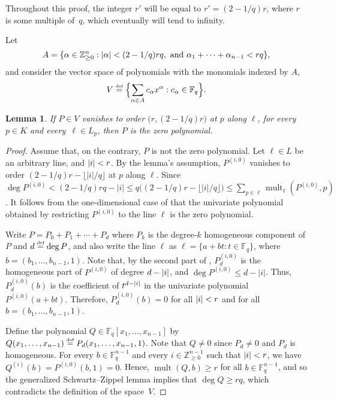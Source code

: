 \documentclass{daj}
\newtheorem{lemma}[theorem]{Lemma}
\theoremstyle{definition}
\newcommand*{\eqdef}{\stackrel{\mbox{\normalfont\tiny def}}{=}}   %
\newcommand*{\Znneg}{\mathbb{Z}_{\geq 0}}                          %
\newcommand*{\Fq}{\mathbb{F}_q}                                  %
\DeclarePairedDelimiter\abs{\lvert}{\rvert}                     %
\DeclareMathOperator{\mult}{mult}                              %
\begin{document}
Throughout this proof, the integer $r'$ will be equal to $r'=(2-1/q)r$, where $r$ is some multiple of~$q$,
which eventually will tend to infinity.

Let
\[
  A=\{\alpha \in\Znneg^n : \abs{\alpha}<(2-1/q)rq,\text{ and } \alpha_1+\dotsb+\alpha_{n-1}<rq\},
\]
and consider the vector space of polynomials with the monomials indexed by $A$,
\[
  V\eqdef \Bigl\{\sum_{\alpha\in A} c_{\alpha} x^\alpha : c_\alpha\in \Fq\Bigr\}.
\]

\begin{lemma}\label{lemma:ZeroPoly}
If $P\in V$ vanishes to order $\bigl(r,(2-1/q)r\bigr)$ at $p$ along $\ell$, for every $p\in K$ and every~$\ell\in L_p$, then $P$ is the zero polynomial.
\end{lemma}
\begin{proof}
  Assume that, on the contrary, $P$ is not the zero polynomial.
  Let $\ell\in L$ be an arbitrary line, and $\abs{i}<r$. By the lemma's assumption, $P^{(i,0)}$ vanishes to order $(2-1/q)r-\lfloor |i|/q \rfloor$ at $p$ along $\ell$.
  Since $\deg P^{(i,0)}< (2-1/q)rq-|i|\leq q\big((2-1/q)r-\lfloor |i|/q\rfloor\big)\leq \sum_{p\in\ell}\mult_\ell(P^{(i,0)},p)$. It follows from the one-dimensional case of  that the univariate polynomial obtained
  by restricting $P^{(i,0)}$ to the line $\ell$ is the zero polynomial.

  Write $P=P_0+P_1+\dotsb+P_d$ where $P_k$ is the degree-$k$ homogeneous component of $P$ and $d\eqdef\nobreak \deg P$,
  and also write the line $\ell$ as $\ell=\{a+bt:t\in\Fq\}$, where $b=(b_1,\dotsc,b_{n-1},1)$.
  Note that, by the second part of , $P_d^{(i,0)}$ is the homogeneous part of $P^{(i,0)}$ of degree $d-\abs{i}$, and $\deg P^{(i,0)}\leq d-|i|$. Thus, $P_d^{(i,0)}(b)$ is the coefficient of $t^{d-\abs{i}}$ in the univariate polynomial $P^{(i,0)}(a+bt)$. Therefore, $P_d^{(i,0)}(b)=0$ for all $\abs{i}< r$ and for all~$b=(b_1,\dotsc,b_{n-1},1)$.

  Define the polynomial $Q\in\Fq[x_1,\dotsc,x_{n-1}]$ by
  $Q(x_1,\dotsc,x_{n-1})\eqdef P_d(x_1,\dotsc,x_{n-1},1)$. Note that $Q\neq 0$  since $P_d\neq 0$ and $P_d$ is homogeneous. For every $b\in \Fq^{n-1}$ and every $i\in\mathbb{Z}_{\geq 0}^{n-1}$ such that $\abs{i}<r$,
  we have \break$Q^{(i)}(b)=P^{(i,0)}(b,1)=0$. Hence, $\mult(Q,b)\geq r$ for all $b\in\Fq^{n-1}$, and so the generalized Schwartz--Zippel lemma implies that $\deg Q\geq rq$, which contradicts
  the definition of the space~$V$.
\end{proof}
\end{document}
